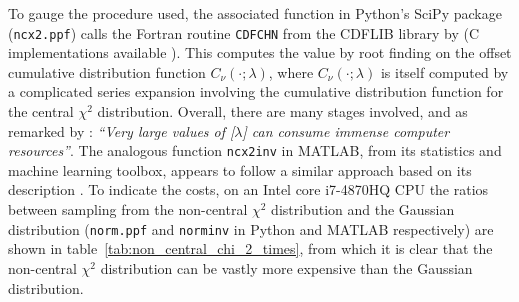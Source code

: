 \documentclass[9pt,a4paper,english]{extarticle}
\begin{document}
To gauge the procedure used, the associated function in Python's SciPy package (\texttt{ncx2.ppf}) calls the Fortran routine \texttt{CDFCHN} from the CDFLIB library by \citet{brown1994dcdflib} (C implementations available \citep{burkardt2020cdflib}). This computes the value by root finding  \citep[algorithm~R]{bus1975two} on the offset cumulative distribution function $ C_\nu(\cdot;\lambda) $, where $ C_\nu(\cdot;\lambda) $ is itself computed by a complicated series expansion \citep[(26.4.25)]{abramowitz1948handbook} involving the cumulative distribution function for the central $ \chi^2 $ distribution. Overall, there are many stages involved, and as remarked by \citet[\texttt{cdflib.c}]{burkardt2020cdflib}: \textit{``Very large values of
[$ \lambda $] can consume immense computer resources''}. The analogous function \texttt{ncx2inv} in MATLAB, from its statistics and machine learning toolbox, appears to follow a similar approach based on its description \citep[page~4301]{matlab2018statistics}. To indicate the costs, on an Intel core i7-4870HQ CPU the ratios between sampling from the non-central $ \chi^2 $ distribution and the Gaussian distribution (\texttt{norm.ppf} and \texttt{norminv} in Python and MATLAB respectively) are shown in table~\ref{tab:non_central_chi_2_times}, from which it is clear that the non-central $ \chi^2 $ distribution can be vastly more expensive than the Gaussian distribution. 
\end{document}
